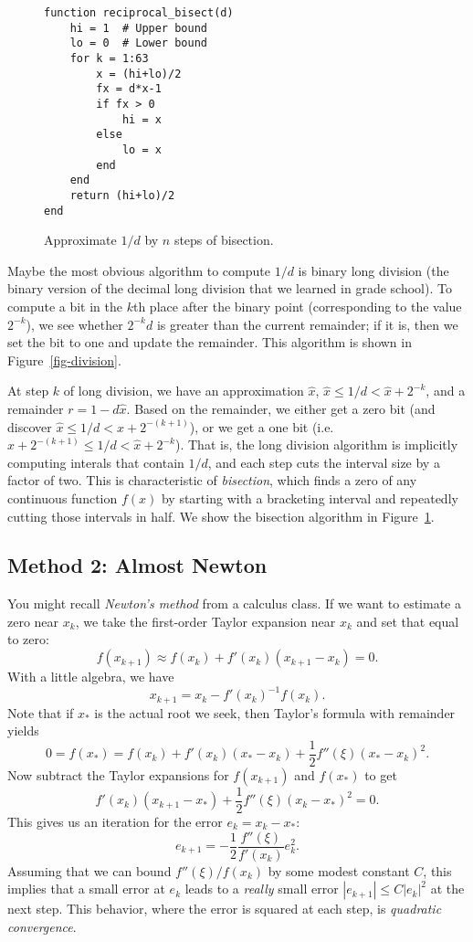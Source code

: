 \documentclass[12pt, leqno]{article}
\begin{document}
\begin{figure}
\begin{lstlisting}
function reciprocal_bisect(d)
    hi = 1  # Upper bound
    lo = 0  # Lower bound
    for k = 1:63
        x = (hi+lo)/2
        fx = d*x-1
        if fx > 0
            hi = x
        else
            lo = x
        end
    end
    return (hi+lo)/2
end
\end{lstlisting}
\caption{Approximate $1/d$ by $n$ steps of bisection.}
\label{fig-bisect}
\end{figure}

Maybe the most obvious algorithm to compute $1/d$ is binary long
division (the binary version of the decimal long division that
we learned in grade school).  To compute a bit in the $k$th place
after the binary point (corresponding to the value $2^{-k}$),
we see whether $2^{-k} d$ is greater than the current remainder;
if it is, then we set the bit to one and update the remainder.
This algorithm is shown in Figure~\ref{fig-division}.

At step $k$ of long division, we have an approximation $\hat{x}$,
$\hat{x} \leq 1/d < \hat{x}+2^{-k}$, and a remainder $r = 1-d
\hat{x}$.  Based on the remainder, we either get a zero bit (and
discover $\hat{x} \leq 1/d < \hat{x}+2^{-(k+1)}$), or we get a one bit
(i.e. $\hat{x}+2^{-(k+1)} \leq 1/d < \hat{x}+2^{-k}$).  That is,
the long division algorithm is implicitly computing interals that
contain $1/d$, and each step cuts the interval size by a factor of
two.  This is characteristic of {\em bisection}, which finds a zero
of any continuous function $f(x)$ by starting with a bracketing interval
and repeatedly cutting those intervals in half.  We show the
bisection algorithm in Figure~\ref{fig-bisect}.

\subsection*{Method 2: Almost Newton}

You might recall {\em Newton's method} from a calculus class.
If we want to estimate a zero near $x_k$, we take the first-order
Taylor expansion near $x_k$ and set that equal to zero:
\[
  f(x_{k+1}) \approx f(x_k) + f'(x_k)(x_{k+1}-x_k) = 0.
\]
With a little algebra, we have
\[
  x_{k+1} = x_k - f'(x_k)^{-1} f(x_k).
\]
Note that if $x_*$ is the actual root we seek, then
Taylor's formula with remainder yields
\[
  0 = f(x_*) = f(x_k) + f'(x_k)(x_*-x_k) + \frac{1}{2} f''(\xi) (x_*-x_k)^2.
\]
Now subtract the Taylor expansions for $f(x_{k+1})$ and $f(x_*)$ to get
\[
  f'(x_k)(x_{k+1}-x_*) + \frac{1}{2} f''(\xi) (x_k-x_*)^2 = 0.
\]
This gives us an iteration for the error $e_k = x_k-x_*$:
\[
  e_{k+1} = -\frac{1}{2} \frac{f''(\xi)}{f'(x_k)} e_k^2.
\]
Assuming that we can bound $f''(\xi)/f(x_k)$ by some modest constant $C$,
this implies that a small error at $e_k$ leads to a {\em really}
small error $|e_{k+1}| \leq C|e_k|^2$ at the next step.  This behavior,
where the error is squared at each step, is {\em quadratic convergence}.
\end{document}
